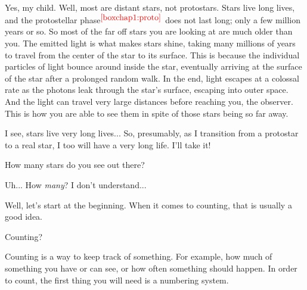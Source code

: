 \documentclass[main.tex]{subfiles}
\begin{document}
\par \Pleione Yes, my child.  Well, most are distant stars, not protostars.  Stars live long lives, and the protostellar phase$^{\textcolor{red}{\ref{boxchap1:proto}}}$ does not last long; only a few million years or so.  So most of the far off stars you are looking at are much older than you.  The emitted light is what makes stars shine, taking many millions of years to travel from the center of the star to its surface.  This is because the individual particles of light bounce around inside the star, eventually arriving at the surface of the star after a prolonged random walk.  In the end, light escapes at a colossal rate as the photons leak through the star's surface, escaping into outer space.  And the light can travel very large distances before reaching you, the observer.  This is how you are able to see them in spite of those stars being so far away.  


\par \Maia I see, stars live very long lives...  So, presumably, as I transition from a protostar to a real star, I too will have a very long life.  I'll take it!  

\par \Pleione How many stars do you see out there?

\par \Maia Uh... How \textit{many}?  I don't understand...

\par \Pleione Well, let's start at the beginning.  When it comes to counting, that is usually a good idea. 

\par \Maia Counting?

\par \Pleione  Counting is a way to keep track of something.  For example, how much of something you have or can see, or how often something should happen.  In order to count, the first thing you will need is a numbering system.

\end{document}
